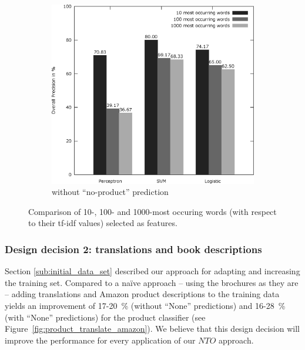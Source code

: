 \begin{figure}[h!]
\begin{subfigure}[t]{0.5\textwidth}
		\includegraphics[width=\textwidth]{figures/product_feature_selection_without_none.eps}
		\caption{without ``no-product'' prediction}
	\end{subfigure}
	\caption{Comparison of 10-, 100- and 1000-most occuring words (with respect to their tf-idf values) selected as features.}
	\label{fig:product_feature_selection}
\end{figure}

\subsubsection{Design decision 2: translations and book descriptions}
Section \ref{sub:initial_data_set} described our approach for adapting and increasing the training set.
Compared to a na\"ive approach -- using the brochures as they are -- adding translations and Amazon product descriptions to the training data yields an improvement of 17-20~\% (without ``None'' predictions) and 16-28~\% (with ``None'' predictions) for the product classifier (see Figure~\ref{fig:product_translate_amazon}).
We believe that this design decision will improve the performance for every application of our $NTO$ approach.

